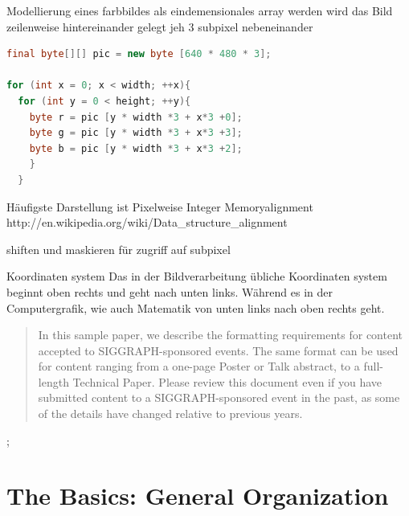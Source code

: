 \documentclass[tog]{acmsiggraph}
\begin{document}
Modellierung eines farbbildes als eindemensionales array
werden wird das Bild zeilenweise hintereinander gelegt jeh 3 subpixel nebeneinander

\begin{lstlisting}[language=Java]
final byte[][] pic = new byte [640 * 480 * 3];

for (int x = 0; x < width; ++x){
  for (int y = 0 < height; ++y){
    byte r = pic [y * width *3 + x*3 +0]; 
    byte g = pic [y * width *3 + x*3 +3];
    byte b = pic [y * width *3 + x*3 +2];
    }
  }
\end{lstlisting}

Häufigste Darstellung ist Pixelweise Integer
Memoryalignment
http://en.wikipedia.org/wiki/Data\_structure\_alignment

shiften und maskieren für zugriff auf subpixel



Koordinaten system
Das in der Bildverarbeitung übliche Koordinaten system beginnt oben rechts und geht nach unten links. Während es in der Computergrafik, wie auch Matematik von unten links nach oben rechts geht.





\begin{abstract}

In this sample paper, we describe the formatting requirements for
content accepted to SIGGRAPH-sponsored events. The same format can be
used for content ranging from a one-page Poster or Talk abstract, to a
full-length Technical Paper. Please review this document even if you
have submitted content to a SIGGRAPH-sponsored event in the past, as
some of the details have changed relative to previous years.

\end{abstract}

\begin{CRcatlist}
  ;
\end{CRcatlist}

\keywordlist


\copyrightspace

\section{The Basics: General Organization}
\end{document}
